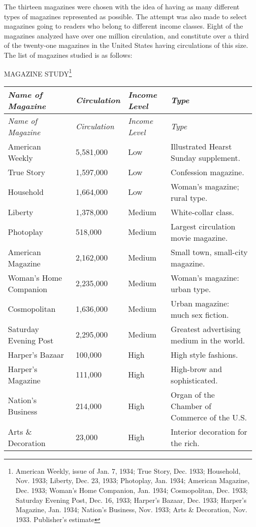 \documentclass[openany,nobib]{tufte-book}
\begin{document}
The thirteen magazines were chosen with the idea of having as many
different types of magazines represented as possible. The attempt was
also made to select magazines going to readers who belong to different
income classes. Eight of the magazines analyzed have over one million
circulation, and constitute over a third of the twenty-one magazines in
the United States having circulations of this size. The list of
magazines studied is as follows:

\vspace{5mm}

\begin{center}MAGAZINE STUDY\footnote{American Weekly, issue of Jan. 7, 1934; True Story, Dec. 1933;
  Household, Nov. 1933; Liberty, Dec. 23, 1933; Photoplay, Jan. 1934;
  American Magazine, Dec. 1933; Woman's Home Companion, Jan. 1934;
  Cosmopolitan, Dec. 1933; Saturday Evening Post, Dec. 16, 1933;
  Harper's Bazaar, Dec. 1933; Harper's Magazine, Jan. 1934; Nation's
  Business, Nov. 1933; Arts \& Decoration, Nov. 1933. Publisher's estimate}\end{center}
\tabulinesep=1.1mm
{\begin{longtabu} to 1.05\textwidth { X[2,l] X[1,r] X[1,l] X[3,l] } 
\emph{Name of Magazine} & \emph{Circulation} & \emph{Income Level} & \emph{Type} \\ [1.5ex]
\endfirsthead
\emph{Name of Magazine} & \emph{Circulation} & \emph{Income Level} & \emph{Type} \\ [1.5ex]
\endhead
American Weekly & 5,581,000 & Low & Illustrated Hearst Sunday supplement. \\
True Story & 1,597,000 & Low & Confession magazine. \\
Household & 1,664,000 & Low & Woman's magazine; rural type. \\
Liberty & 1,378,000 & Medium & White-collar class. \\
Photoplay & 518,000 & Medium & Largest circulation movie magazine. \\
American Magazine & 2,162,000 & Medium & Small town, small-city magazine. \\
Woman's Home Companion & 2,235,000 & Medium & Woman's magazine: urban type. \\
Cosmopolitan & 1,636,000 & Medium & Urban magazine: much sex fiction. \\
Saturday Evening Post & 2,295,000 & Medium & Greatest advertising medium in the world. \\
Harper's Bazaar & 100,000 & High & High style fashions. \\
Harper's Magazine & 111,000 & High & High-brow and sophisticated. \\
Nation's Business & 214,000 & High & Organ of the Chamber of Commerce of the U.S. \\
Arts \& Decoration & 23,000 & High & Interior decoration for the rich. \\
\end{longtabu}}
\end{document}

